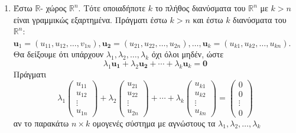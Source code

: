\begin{examples}
\item {}
    \begin{enumerate}
        \item 
            Έστω $ \mathbb{R} $- χώρος $ \mathbb{R}^{n} $. Τότε οποιαδήποτε $ k $ 
            το πλήθος διανύσματα του $ \mathbb{R}^{n} $ με $ k >n $ είναι 
            γραμμικώς εξαρτημένα. Πράγματι έστω $ k>n $ και έστω $k$ διανύσματα του 
            $ \mathbb{R}^{n} $: 
            $ \mathbf{u}_{1} = (u_{11}, u_{12}, \ldots, v_{1n}), 
            \mathbf{u_{2}}=(u_{21},u_{22},\ldots,u_{2n}), \ldots, 
            \mathbf{u}_{k}= (u_{k1}, u_{k2}, \ldots, u_{kn}) $. Θα δείξουμε 
            ότι υπάρχουν 
            $ \lambda _{1}, \lambda _{2}, \ldots, \lambda _{k} $ όχι όλοι μηδέν, 
            ώστε
            \[ 
                \lambda _{1} \mathbf{u_{1}}+ \lambda _{2} \mathbf{u_{2}}+\cdots+ 
                \lambda _{k} \mathbf{u}_{k} = \mathbf{0} 
            \] 
            Πράγματι 
            \[
                \lambda_{1} 
                \begin{pmatrix*} 
                    u_{11} \\ u_{12} \\ \vdots \\ u_{1n} 
                \end{pmatrix*} + 
                \lambda _{2} 
                \begin{pmatrix*} 
                    u_{21} \\ u_{22} \\ \vdots \\ u_{2n} 
                \end{pmatrix*} + \cdots + 
                \lambda _{k} 
                \begin{pmatrix*} 
                    u_{k1} \\ u_{k2} \\ \vdots \\ u_{kn} 
                \end{pmatrix*} 
                = \begin{pmatrix*} 0 \\ 0 \\ \vdots \\ 0 \end{pmatrix*} 
            \]
            αν το παρακάτω $ n \times k $ ομογενές σύστημα με αγνώστους τα 
            $ \lambda _{1}, \lambda _{2}, \ldots, \lambda _{k} $ 
            \begin{equation*}

\end{equation*}
\end{enumerate}
\end{examples}
